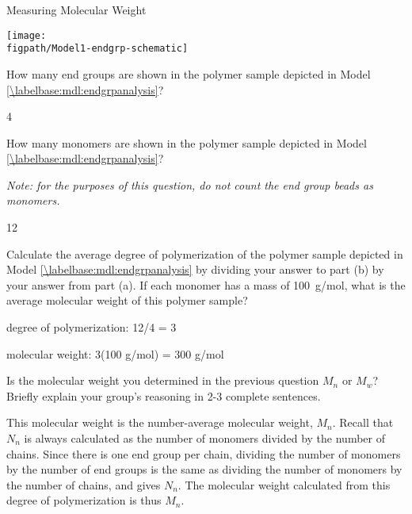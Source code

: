 \begin{activity}{Measuring Molecular Weight}
\begin{model}
	\centerline{\texttt{[image: \\figpath/Model1-endgrp-schematic]}}

\end{model}


\begin{ctqs}

	\question How many end groups are shown in the polymer sample depicted in Model \ref{\labelbase:mdl:endgrpanalysis}?
	
		\begin{solution}[0.25in]{}
			4
		\end{solution}
	
	\question How many monomers are shown in the polymer sample depicted in Model \ref{\labelbase:mdl:endgrpanalysis}?
	
		\emph{Note: for the purposes of this question, do not count the end group beads as monomers.}
	
		\begin{solution}[0.25in]{}
			12
		\end{solution}
	
	\question Calculate the average degree of polymerization of the polymer sample depicted in Model \ref{\labelbase:mdl:endgrpanalysis} by dividing your answer to part (b) by your answer from part (a).  If each monomer has a mass of 100~g/mol, what is the average molecular weight of this polymer sample?
	
		\begin{solution}[0.5in]{}
			degree of polymerization: 12/4 = 3
			
			molecular weight: 3(100 g/mol) = 300 g/mol
		\end{solution}
	
	\question Is the molecular weight you determined in the previous question $M_n$ or $M_w$?  Briefly explain your group's reasoning in 2-3 complete sentences.
	
		\begin{solution}[1.5in]{}
			This molecular weight is the number-average molecular weight, $M_n$.  Recall that $N_n$ is always calculated as the number of monomers divided by the number of chains.  Since there is one end group per chain, dividing the number of monomers by the number of end groups is the same as dividing the number of monomers by the number of chains, and gives $N_n$.  The molecular weight calculated from this degree of polymerization is thus $M_n$.
		\end{solution}
	
\end{ctqs}


\end{activity}
